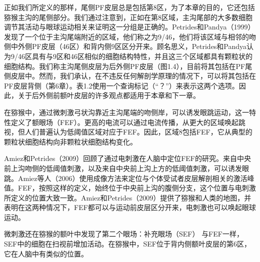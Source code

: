 正如我们所定义的那样，尾侧PF皮层总是包括第8区，为了本章的目的，它还包括猕猴主沟的尾侧部分。我们通过注意到，正如在第8区域\cite{Chafee & Goldman-Rakic 1998}，主沟尾部的大多数细胞调节其活动与眼球运动相关\cite{Tanila et al. 1993}来证明这一分组是正确的。Petrides和Pandya（1999）发现了一个位于主沟尾端附近的区域，他们称之为9/46，他们将该区域与相邻的吻侧中外侧PF皮层（46区）和背内侧9区区分开来。顾名思义，Petrides和Pandya认为9/46区具有与9区和46区相似的细胞结构特性，并且这三个区域都具有颗粒状的细胞结构。我们称主沟尾侧皮层为后外侧PF皮层（图1.4），目前将其包括在PF尾侧皮层中。然而，我们承认，在不违反任何解剖学原理的情况下，可以将其包括在PF皮层背侧（第6章）。表1.2使用一个查询标记（“？”）来表示这两个选项。因此，关于后外侧前额叶皮层的许多观点都适用于本章和下一章。

在猕猴中，通过微刺激弓状沟靠近主沟尾端的吻侧岸，可以诱发眼跳运动\cite{Bruce et al. 1985}，这一特性定义了额眼场（FEF）。更高的电流可以通过电流传播，从更大的区域唤起跳视\cite{Robinson & Fuchs 1969}，但人们普遍认为低阈值区域对应于FEF。因此，区域8包括FEF，它从典型的颗粒状细胞结构向非颗粒状细胞结构变化\cite{Stanton et al. 1989}。

Amiez和Petrides（2009）回顾了通过电刺激在人脑中定位FEF的研究。来自中央前上沟吻侧的低阈值刺激，以及来自中央前上沟上方的低阈值刺激，可以诱发眼跳。Amiez等人（2006）使用成像方法来定位与个体受试者皮层解剖相关的激活峰值。FEF，按照这样的定义，始终位于中央前上沟的腹侧分支，这个位置与电刺激所定义的位置大致一致。Amiez和Petrides（2009）提供了猕猴和人类的地图，并表明在这两种情况下，FEF都可以与运动前皮层区分开来，电刺激也可以唤起眼球运动。

微刺激还在猕猴的额叶中发现了第二个眼场：补充眼场（SEF） \cite{Schlag & Schlag-Rey 1987}与FEF一样，SEF中的细胞在扫视前增加活动\cite{Hanes et al. 1995}。在猕猴中，SEF位于背内侧额叶皮层的第6区\cite{Schlag & Schlag-Rey 1987;Olson & Gettner 1999}，它在人脑中有类似的位置\cite{Amiez & Petrides 2009}。
